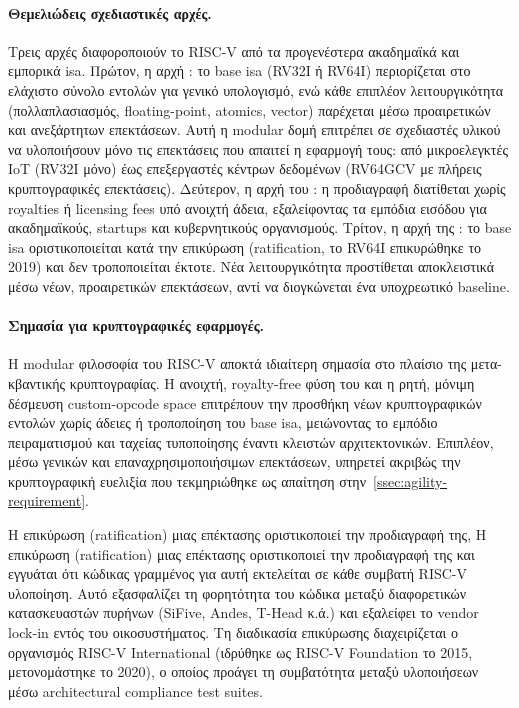 \paragraph{Θεμελιώδεις σχεδιαστικές αρχές.}
Τρεις αρχές διαφοροποιούν το RISC-V από τα προγενέστερα ακαδημαϊκά και
εμπορικά \gls{isa}. Πρώτον, η αρχή :
το base \gls{isa} (RV32I ή RV64I) περιορίζεται στο ελάχιστο σύνολο εντολών για
γενικό υπολογισμό, ενώ κάθε επιπλέον λειτουργικότητα (πολλαπλασιασμός,
floating-point, atomics, vector) παρέχεται μέσω προαιρετικών και ανεξάρτητων
επεκτάσεων. Αυτή η modular δομή
επιτρέπει σε σχεδιαστές υλικού να υλοποιήσουν μόνο τις επεκτάσεις που
απαιτεί η εφαρμογή τους: από μικροελεγκτές IoT (RV32I μόνο) έως
επεξεργαστές κέντρων δεδομένων (RV64GCV με πλήρεις κρυπτογραφικές
επεκτάσεις). Δεύτερον, η αρχή του : η προδιαγραφή
διατίθεται χωρίς royalties ή licensing fees υπό ανοιχτή άδεια, εξαλείφοντας
τα εμπόδια εισόδου για ακαδημαϊκούς, startups και κυβερνητικούς οργανισμούς.
Τρίτον, η αρχή της : το base \gls{isa} οριστικοποιείται
κατά την επικύρωση (ratification, το RV64I επικυρώθηκε το 2019) και δεν
τροποποιείται έκτοτε. Νέα λειτουργικότητα προστίθεται αποκλειστικά μέσω νέων,
προαιρετικών επεκτάσεων, αντί να διογκώνεται ένα υποχρεωτικό baseline.

\paragraph{Σημασία για κρυπτογραφικές εφαρμογές.}
Η modular φιλοσοφία του RISC-V αποκτά ιδιαίτερη σημασία στο πλαίσιο της
μετα-κβαντικής κρυπτογραφίας. Η ανοιχτή, royalty-free φύση του και η ρητή, μόνιμη δέσμευση custom-opcode
space επιτρέπουν την προσθήκη νέων κρυπτογραφικών εντολών χωρίς άδειες ή
τροποποίηση του base \gls{isa}, μειώνοντας το εμπόδιο πειραματισμού και
ταχείας τυποποίησης έναντι κλειστών αρχιτεκτονικών.
Επιπλέον, μέσω γενικών και επαναχρησιμοποιήσιμων επεκτάσεων, υπηρετεί ακριβώς την
κρυπτογραφική ευελιξία που τεκμηριώθηκε ως απαίτηση
στην~\cref{ssec:agility-requirement}.

Η επικύρωση (ratification) μιας επέκτασης οριστικοποιεί την προδιαγραφή της,
Η επικύρωση (ratification) μιας επέκτασης οριστικοποιεί την προδιαγραφή της και
εγγυάται ότι κώδικας γραμμένος για αυτή εκτελείται σε κάθε συμβατή RISC-V
υλοποίηση. Αυτό εξασφαλίζει τη φορητότητα του κώδικα μεταξύ διαφορετικών κατασκευαστών
πυρήνων (SiFive, Andes, T-Head κ.ά.) και εξαλείφει το vendor lock-in εντός του
οικοσυστήματος. Τη διαδικασία επικύρωσης διαχειρίζεται ο οργανισμός RISC-V International
(ιδρύθηκε ως RISC-V Foundation το 2015, μετονομάστηκε το 2020), ο οποίος
προάγει τη συμβατότητα μεταξύ υλοποιήσεων μέσω architectural compliance test
suites.

